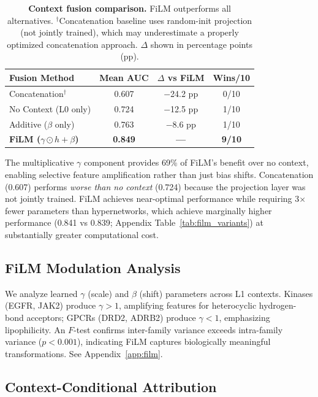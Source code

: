 \documentclass{article}
\begin{document}
\begin{table}[h]
\vspace{-2mm}
\caption{\textbf{Context fusion comparison.} FiLM outperforms all alternatives. $^\dagger$Concatenation baseline uses random-init projection (not jointly trained), which may underestimate a properly optimized concatenation approach. $\Delta$ shown in percentage points (pp).}
\label{tab:fusion}
\centering
\small
\begin{tabular}{@{}lccc@{}}
\toprule
\textbf{Fusion Method} & \textbf{Mean AUC} & \textbf{$\Delta$ vs FiLM} & \textbf{Wins/10} \\
\midrule
Concatenation$^\dagger$ & 0.607 & $-$24.2 pp & 0/10 \\
No Context (L0 only) & 0.724 & $-$12.5 pp & 1/10 \\
Additive ($\beta$ only) & 0.763 & $-$8.6 pp & 1/10 \\
\textbf{FiLM ($\gamma \odot h + \beta$)} & \textbf{0.849} & \textbf{---} & \textbf{9/10} \\
\bottomrule
\end{tabular}
\vspace{-2mm}
\end{table}

The multiplicative $\gamma$ component provides 69\% of FiLM's benefit over no context, enabling selective feature amplification rather than just bias shifts. Concatenation (0.607) performs \textit{worse than no context} (0.724) because the projection layer was not jointly trained. FiLM achieves near-optimal performance while requiring 3$\times$ fewer parameters than hypernetworks, which achieve marginally higher performance (0.841 vs 0.839; Appendix Table~\ref{tab:film_variants}) at substantially greater computational cost.

\subsection{FiLM Modulation Analysis}

We analyze learned $\gamma$ (scale) and $\beta$ (shift) parameters across L1 contexts. Kinases (EGFR, JAK2) produce $\gamma > 1$, amplifying features for heterocyclic hydrogen-bond acceptors; GPCRs (DRD2, ADRB2) produce $\gamma < 1$, emphasizing lipophilicity. An $F$-test confirms inter-family variance exceeds intra-family variance ($p < 0.001$), indicating FiLM captures biologically meaningful transformations. See Appendix~\ref{app:film}.

\subsection{Context-Conditional Attribution}
\end{document}
